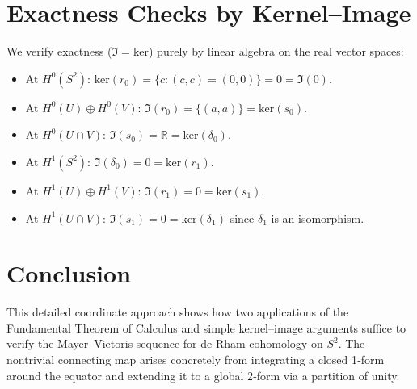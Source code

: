 \documentclass[11pt]{article}
\newcommand{\R}{\mathbb{R}}
\newcommand{\Ker}{\mathrm{ker}}
\begin{document}
	\section{Exactness Checks by Kernel–Image}
	We verify exactness ($\Im=\Ker$) purely by linear algebra on the real vector spaces:
	\begin{itemize}
		\item At $H^0(S^2)$: $\Ker(r_0)=\{c:(c,c)=(0,0)\}=0=\Im(0).$
		\item At $H^0(U)\oplus H^0(V)$: $\Im(r_0)=\{(a,a)\}=\Ker(s_0).$
		\item At $H^0(U\cap V)$: $\Im(s_0)=\R=\Ker(\delta_0).$
		\item At $H^1(S^2)$: $\Im(\delta_0)=0=\Ker(r_1).$
		\item At $H^1(U)\oplus H^1(V)$: $\Im(r_1)=0=\Ker(s_1).$
		\item At $H^1(U\cap V)$: $\Im(s_1)=0=\Ker(\delta_1)$ since $\delta_1$ is an isomorphism.
	\end{itemize}
	
	\section{Conclusion}
	This detailed coordinate approach shows how two applications of the Fundamental Theorem of Calculus and simple kernel–image arguments suffice to verify the Mayer–Vietoris sequence for de Rham cohomology on $S^2$.  The nontrivial connecting map arises concretely from integrating a closed 1‑form around the equator and extending it to a global 2‑form via a partition of unity.
	
	
\end{document}
